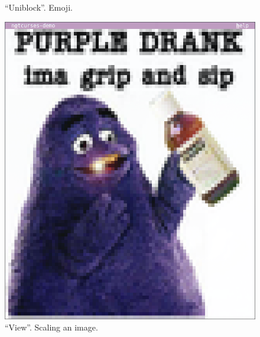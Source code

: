 \documentclass[letterpaper,10pt]{article}
\begin{document}
\begin{figure}
\begin{minipage}{0.45\textwidth}
    \caption{``Uniblock''. Emoji.}
  \end{minipage}\hfill
\end{figure}

\begin{figure}
  \centering
  \begin{minipage}{0.45\textwidth}
    \includegraphics[width=1\linewidth]{media/demo-img1.png}
    \caption{``View''. Scaling an image.}
  \end{minipage}\hfill
  \begin{minipage}{0.45\textwidth}

\end{minipage}
\end{figure}
\end{document}
